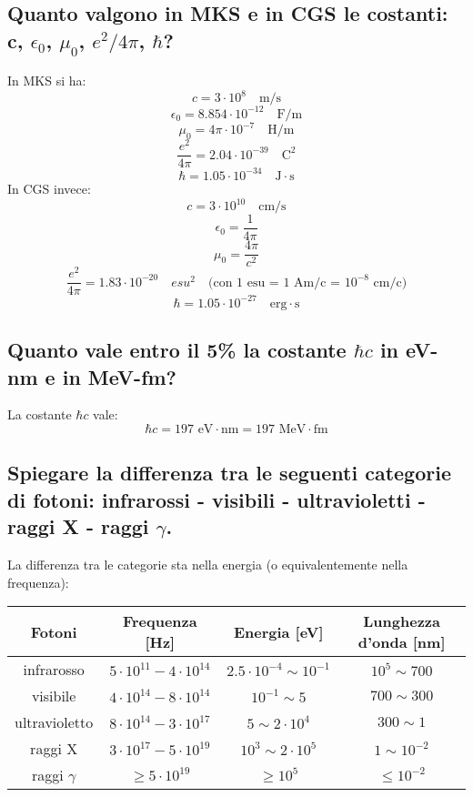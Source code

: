 \subsection[]{ Quanto valgono in MKS e in CGS le costanti: c, $\epsilon_0$,  $\mu_0$, $e^2/4\pi$,  $\hbar$?} 
In MKS si ha:
\[
	c = 3 \cdot 10^{8} \quad \text{m/s}
\] 
\[
	\epsilon_0 = 8.854 \cdot 10^{-12} \quad \text{F/m}
\]
\[
	\mu_0 = 4\pi \cdot 10^{-7} \quad \text{H/m}
\] 
\[
	\frac{e^{2}}{4\pi} = 2.04 \cdot 10^{-39} \quad \text{C}^{2}
\] 
\[
	\hbar = 1.05 \cdot 10^{-34} \quad \text{J} \cdot \text{s}
\] 
In CGS invece:
\[
	c = 3 \cdot 10^{10} \quad \text{cm/s}
\] 
\[
	\epsilon_0 = \frac{1}{4\pi}
\]
\[
	\mu_0 = \frac{4\pi}{c^{2}} 
\] 
\[
	\frac{e^{2}}{4\pi} = 1.83 \cdot 10^{-20} \quad esu^{2} \quad \text{(con 1 esu = 1 Am/c = $10^{-8}$ cm/c)} 
\] 
\[
	\hbar = 1.05 \cdot 10^{-27} \quad \text{erg} \cdot \text{s}
\]

\subsection[]{Quanto vale entro il 5\% la costante $\hbar c$ in eV-nm e in MeV-fm?}
La costante $\hbar c$ vale:
\[
\hbar c = 197 \text{ eV}\cdot \text{nm} = 197 \text{ MeV}\cdot\text{fm}
\]  

\subsection[]{Spiegare la differenza tra le seguenti categorie di fotoni: infrarossi - visibili - ultravioletti - raggi X - raggi $\gamma$. } 
La differenza tra le categorie sta nella energia (o equivalentemente nella frequenza):
\begin{table}[H]
	\centering
	\label{tab: fotoni}
	\begin{tabular}{cccc}
		Fotoni & Frequenza [Hz] & Energia [eV] & Lunghezza d'onda [nm] \\
		\hline
		infrarosso 	&  $5 \cdot 10^{11} - 4 \cdot 10^{14}$ 	& $2.5\cdot10^{-4}\sim 10^{-1}$		&  $ 10^{5} \sim 700$  \\
		visibile 	&  $4 \cdot 10^{14} - 8 \cdot 10^{14}$ 	&    $10^{-1} \sim 5$ 			&  $700 \sim 300$ \\
		ultravioletto 	&  $8 \cdot 10^{14} - 3 \cdot 10^{17}$ 	&      $5 \sim 2\cdot 10^4$		& $300 \sim 1 $  \\
		raggi X 	&  $3 \cdot 10^{17} - 5 \cdot 10^{19}$ 	& $ 10^3 \sim 2 \cdot 10^{5} $ 		&  $1 \sim 10^{-2}$  \\
		raggi $\gamma$ 	&   $\ge 5 \cdot 10^{19}$ 		&       $\ge 10^5$			& $\le 10^{-2}$
	\end{tabular}
\end{table}


